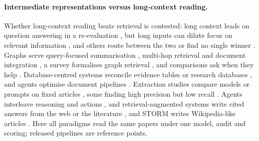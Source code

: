 \documentclass{article} %
\begin{document}
\paragraph{Intermediate representations versus long-context reading.}
Whether long-context reading beats retrieval is contested: long context leads on question answering in a re-evaluation \citep{Li2024LongContext}, but long inputs can dilute focus on relevant information \citep{Yu2024DefenseRag,liu2024lost,Zhang2024ChainAgents}, and others route between the two \citep{li2024retrieval} or find no single winner \citep{Li2025LaraBenchmarking}. Graphs serve query-focused summarisation \citep{edge2024local}, multi-hop retrieval \citep{Gutirrez2024HipporagNeurobiologically} and document integration \citep{Sun2024Docs2kgUnified}, a survey formalises graph retrieval \citep{Peng2024GraphRetrievalaugmented}, and comparisons ask when they help \citep{han2025rag,xiang2025use}. Database-centred systems reconcile evidence tables \citep{joshi2026sliders} or research databases \citep{liu2026datastorm}, and agents optimise document pipelines \citep{shankar2025docetl}. Extraction studies compare models or prompts on fixed articles \citep{Konet2024PerformanceTwo,Chen2025LargeLanguage}, some finding high precision but low recall \citep{Li2025WhatLevel,Stewartevans2025ExpeditingData}. Agents interleave reasoning and actions \citep{Yao2022ReactSynergizing}, and retrieval-augmented systems write cited answers from the web \citep{Nakano2021WebgptBrowserassisted} or the literature \citep{Lla2023PaperqaRetrievalaugmented,Asai2024OpenscholarSynthesizing,singh2025ai2}, and STORM writes Wikipedia-like articles \citep{shao2024assisting}. Here all paradigms read the same papers under one model, audit and scoring; released pipelines are reference points.
\end{document}
